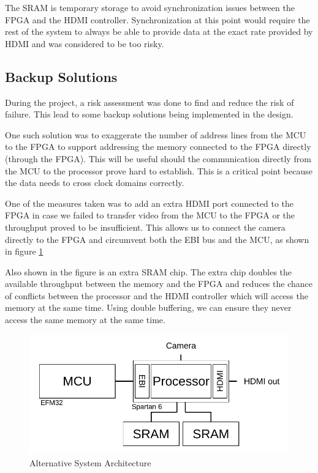 The SRAM is temporary storage to avoid synchronization issues between the FPGA and the HDMI controller.
Synchronization at this point would require the rest of the system to always be able to provide data at the exact rate provided by HDMI and was considered to be too risky.


\subsection{Backup Solutions} \label{subsec:RiskAssessment}
During the project, a risk assessment was done to find and reduce the risk of failure.
This lead to some backup solutions being implemented in the design.

One such solution was to exaggerate the number of address lines from the MCU to the FPGA to support addressing the memory connected to the FPGA directly (through the FPGA).
This will be useful should the communication directly from the MCU to the processor prove hard to establish.
This is a critical point because the data needs to cross clock domains correctly.

One of the measures taken was to add an extra HDMI port connected to the FPGA in case we failed to transfer video from the MCU to the FPGA or the throughput proved to be insufficient.
This allows us to connect the camera directly to the FPGA and circumvent both the EBI bus and the MCU, as shown in figure \ref{fig:SystemArchitectureAlternative}

Also shown in the figure is an extra SRAM chip.
The extra chip doubles the available throughput between the memory and the FPGA and reduces the chance of conflicts between the processor and the HDMI controller which will access the memory at the same time. Using double buffering, we can ensure they never access the same memory at the same time.

\begin{figure}
    \includegraphics{img/SystemArchitectureAlternative.pdf}
    \caption{Alternative System Architecture}
    \label{fig:SystemArchitectureAlternative}
\end{figure}
